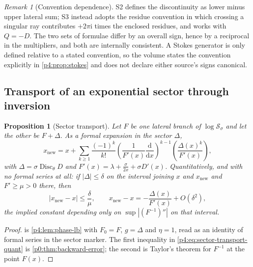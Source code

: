 \documentclass[11pt,a4paper,oneside]{book}
\theoremstyle{plain}
\newtheorem{proposition}[theorem]{Proposition}
\theoremstyle{definition}
\theoremstyle{remark}
\newtheorem{remark}[theorem]{Remark}
\newcommand{\ii}{\mathrm{i}}
\newcommand{\dd}{\mathrm{d}}
\begin{document}
\begin{remark}[Convention dependence]
\label{p4:rem:stokes-convention}
\textsf{S2} defines the discontinuity as lower minus upper lateral sum;
\textsf{S3} instead adopts the residue convention in which crossing a singular
ray contributes $+2\pi\ii$ times the enclosed residues, and works with
$Q=-D$.  The two sets of formulae differ by an overall sign, hence by a
reciprocal in the multipliers, and both are internally consistent.  A Stokes
generator is only defined relative to a stated convention, so the volume
states the convention explicitly in \cref{p4:prop:stokes} and does not declare
either source's signs canonical.
\end{remark}

\subsection{Transport of an exponential sector through inversion}

\begin{proposition}[Sector transport]
\label{p4:prop:sector-transport}
Let $F$ be one lateral branch of $\log\mathcal S_\sigma$ and let the other be
$F+\Delta$.  As a formal expansion in the sector $\Delta$,
\begin{equation}
  x_{\mathrm{new}}=x+\sum_{k\ge1}\frac{(-1)^{k}}{k!}
   \left(\frac1{F'(x)}\frac{\dd}{\dd x}\right)^{\!k-1}
   \left(\frac{\Delta(x)^{k}}{F'(x)}\right),
  \label{p4:eq:sector-transport}
\end{equation}
with $\Delta=\sigma\operatorname{Disc}_\theta D$ and
$F'(x)=\lambda+\tfrac{\sigma}{2x}+\sigma D'(x)$.  Quantitatively, and with no
formal series at all: if $|\Delta|\le\delta$ on the interval joining $x$ and
$x_{\mathrm{new}}$ and $F'\ge\mu>0$ there, then
\begin{equation}
  |x_{\mathrm{new}}-x|\le\frac{\delta}{\mu},
  \qquad
  x_{\mathrm{new}}-x=-\frac{\Delta(x)}{F'(x)}+O(\delta^{2}),
  \label{p4:eq:sector-transport-quant}
\end{equation}
the implied constant depending only on $\sup|(F^{-1})''|$ on that interval.
\end{proposition}

\begin{proof}
 is \cref{p4:lem:phase-lb} with $F_0=F$,
$g=\Delta$ and $\eta=1$, read as an identity of formal series in the sector
marker.  The first inequality in \cref{p4:eq:sector-transport-quant} is
\cref{p0:thm:backward-error}; the second is Taylor's theorem for $F^{-1}$ at
the point $F(x)$.
\end{proof}
\end{document}
